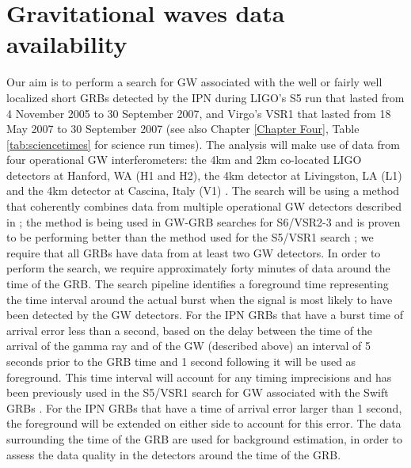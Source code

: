 \section{Gravitational waves data availability}
Our aim is to perform a search for GW associated with the well or fairly well localized short GRBs detected by the IPN during LIGO's S5 run that lasted from 4 November 2005 to 30 September 2007, and Virgo's VSR1 that lasted from 18 May 2007 to 30 September 2007 (see also Chapter \ref{Chapter Four}, Table \ref{tab:sciencetimes} for science run times). The analysis will make use of data from four operational GW interferometers: the 4km and 2km co-located LIGO detectors at Hanford, WA (H1 and H2), the 4km detector at Livingston, LA (L1) and the 4km detector at Cascina, Italy (V1) \cite{Abbott:2007kv, Abadie:2010px, virgostatus}. The search will be using a method that coherently combines data from multiple operational GW detectors described in \cite{Harry:2010fr}; the method is being used in GW-GRB searches for S6/VSR2-3 \cite{lvc:s6grb} and is proven to be performing better than the method used for the S5/VSR1 search \cite{Harry:2010fr, Abadie:2010uf, Collaboration:2009kk}; we require that all GRBs have data from at least two GW detectors. In order to perform the search, we require approximately forty minutes of data around the time of the GRB. The search pipeline identifies a foreground time representing the time interval around the actual burst when the signal is most likely to have been detected by the GW detectors. For the IPN GRBs that have a burst time of arrival error less than a second, based on the delay between the time of the arrival of the gamma ray and of the GW (described above) an interval of 5 seconds prior to the GRB time and 1 second following it will be used as foreground. This time interval will account for any timing imprecisions and has been previously used in the S5/VSR1 search for GW associated with the Swift GRBs \cite{Abadie:2010uf}. For the IPN GRBs that have a time of arrival error larger than 1 second, the foreground will be extended on either side to account for this error.  The data surrounding the time of the GRB are used for background estimation, in order to assess the data quality in the detectors around the time of the GRB. 

